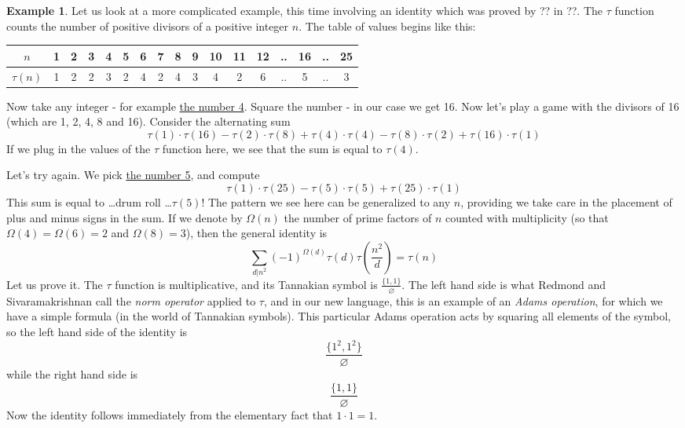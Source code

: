 \documentclass[a4paper]{article}
\theoremstyle{definition}
\newtheorem{example}{Example}[section]
\theoremstyle{remark}
\begin{document}
\begin{example}
Let us look at a more complicated example, this time involving an identity which was proved by ?? in ??. The $\tau$ function counts the number of positive divisors of a positive integer $n$. The table of values begins like this:

\vspace{6pt}
\begin{tabular}{  | c || c | c | c | c | c | c | c | c | c | c | c | c | c | c | c | c |  }
  \hline			
  $n$ & 1 & 2 & 3 & 4 & 5 & 6 & 7 & 8 & 9 & 10 & 11 & 12 & .. & 16 & .. & 25  \\
  \hline
  $\tau(n) $ & 1 & 2 & 2 & 3 & 2 & 4 & 2 & 4 & 3 & 4 & 2 & 6 & .. & 5 & .. & 3  \\
  \hline  
\end{tabular}
\vspace{6pt}

Now take any integer - for example \underline{the number 4}. Square the number - in our case we get 16. Now let's play a game with the divisors of 16 (which are 1, 2, 4, 8 and 16). Consider the alternating sum
$$    \tau(1) \cdot \tau(16) -  \tau(2) \cdot \tau(8) + \tau(4) \cdot \tau(4) - \tau(8) \cdot \tau(2) + \tau(16) \cdot \tau(1)  $$
If we plug in the values of the $\tau$ function here, we see that the sum is equal to $\tau(4)$.

Let's try again. We pick \underline{the number 5}, and compute
$$    \tau(1) \cdot \tau(25) -  \tau(5) \cdot \tau(5) + \tau(25) \cdot \tau(1) $$
This sum is equal to \ldots drum roll \ldots $\tau(5)$!
The pattern we see here can be generalized to any $n$, providing we take care in the placement of plus and minus signs in the sum. If we denote by $\Omega(n)$ the number of prime factors of $n$ counted with multiplicity (so that $\Omega(4) = \Omega(6) = 2$ and $\Omega(8) = 3$), then the general identity is
\begin{equation} \label{introexample2}
\sum_{d \vert n^2} (-1)^{\Omega(d)} \tau(d) \tau(\frac{n^2}{d}) = \tau(n)  
\end{equation}
Let us prove it. The $\tau$ function is multiplicative, and its Tannakian symbol is $\frac{ \{ 1 ,1 \} }{ \varnothing }$. The left hand side is what Redmond and Sivaramakrishnan \cite{} call the \emph{norm operator} applied to $\tau$, and in our new language, this is an example of an \emph{Adams operation}, for which we have a simple formula (in the world of Tannakian symbols). This particular Adams operation acts by squaring all elements of the symbol, so the left hand side of the identity is 
$$\frac{ \{ 1^2, 1^2  \} }{ \varnothing  }$$
while the right hand side is 
$$ \frac{ \{ 1, 1  \} }{ \varnothing  } $$
Now the identity follows immediately from the elementary fact that $1 \cdot 1 = 1$. 
\end{example}
\end{document}
